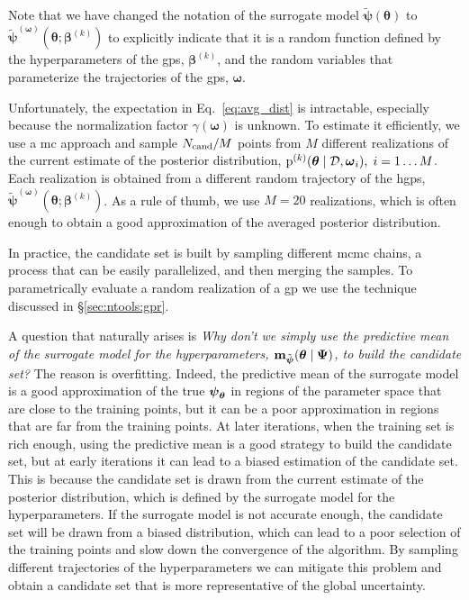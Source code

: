 Note that we have changed the notation of the surrogate model $\tilde{\boldsymbol{\psi}}(\boldsymbol{\theta})$ to $\tilde{\boldsymbol{\psi}}^{(\boldsymbol{\omega})}(\boldsymbol{\theta}; \boldsymbol{\beta}^{(k)})$ to explicitly indicate that it is a random function defined by the hyperparameters of the \glspl{gp}, $\boldsymbol{\beta}^{(k)}$, and the random variables that parameterize the trajectories of the \glspl{gp}, $\boldsymbol{\omega}$. 

\smallskip
Unfortunately, the expectation in Eq.~\eqref{eq:avg_dist} is intractable, especially because the normalization factor $\gamma(\boldsymbol{\omega})$ is unknown. To estimate it efficiently, we use a \gls{mc} approach and sample $N_{\mathrm{cand}}/M$ points from $M$ different realizations of the current estimate of the posterior distribution, $\mathrm{p}^{(k)}(\boldsymbol{\theta} \mid \mathcal{D}, \boldsymbol{\omega}_i),\; i=1\ldots M$. Each realization is obtained from a different random trajectory of the \glspl{hgp}, $\tilde{\boldsymbol{\psi}}^{(\boldsymbol{\omega})}(\boldsymbol{\theta}; \boldsymbol{\beta}^{(k)})$. As a rule of thumb, we use $M=20$ realizations, which is often enough to obtain a good approximation of the averaged posterior distribution. 

\smallskip
In practice, the candidate set is built by sampling different \gls{mcmc} chains, a process that can be easily parallelized, and then merging the samples. To parametrically evaluate a random realization of a \gls{gp} we use the technique discussed in \S\ref{sec:ntools:gpr}.

\smallskip
A question that naturally arises is \textit{Why don't we simply use the predictive mean of the surrogate model for the hyperparameters, $\mathbf{m}_{\tilde{\boldsymbol{\psi}}}(\boldsymbol{\theta} \mid \boldsymbol{\Psi})$, to build the candidate set?} The reason is overfitting. Indeed, the predictive mean of the surrogate model is a good approximation of the true $\boldsymbol{\psi}_{\boldsymbol{\theta}}$ in regions of the parameter space that are close to the training points, but it can be a poor approximation in regions that are far from the training points. At later iterations, when the training set is rich enough, using the predictive mean is a good strategy to build the candidate set, but at early iterations it can lead to a biased estimation of the candidate set. This is because the candidate set is drawn from the current estimate of the posterior distribution, which is defined by the surrogate model for the hyperparameters. If the surrogate model is not accurate enough, the candidate set will be drawn from a biased distribution, which can lead to a poor selection of the training points and slow down the convergence of the algorithm. By sampling different trajectories of the hyperparameters we can mitigate this problem and obtain a candidate set that is more representative of the global uncertainty.

